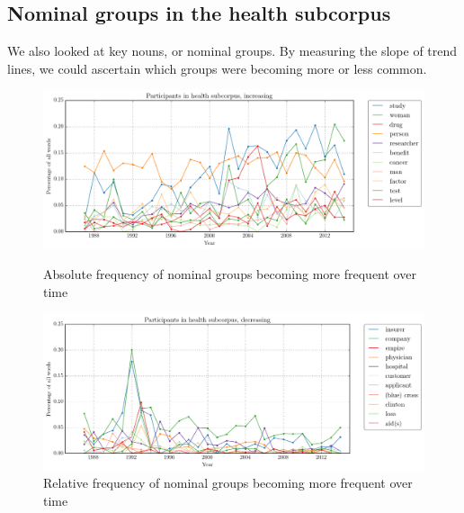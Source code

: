 \subsection{Nominal groups in the health subcorpus}

We also looked at key nouns, or nominal groups. By measuring the slope of trend lines, we could ascertain which groups were becoming more or less common.

\noindent
\begin{figure}[htb!]
\centering
\begin{minipage}{.42\textwidth}
\centering
\includegraphics[width=1\textwidth]{../images/1.png}
\caption{Absolute frequency of nominal groups becoming more frequent over time}
\label{fig:1}
\end{minipage}%
\begin{minipage}{.42\textwidth}
\centering
\includegraphics[width=1\textwidth]{../images/2.png}
\caption{Relative frequency of nominal groups becoming more frequent over time}
\label{fig:2}
\end{minipage}
\end{figure}
\noindent
